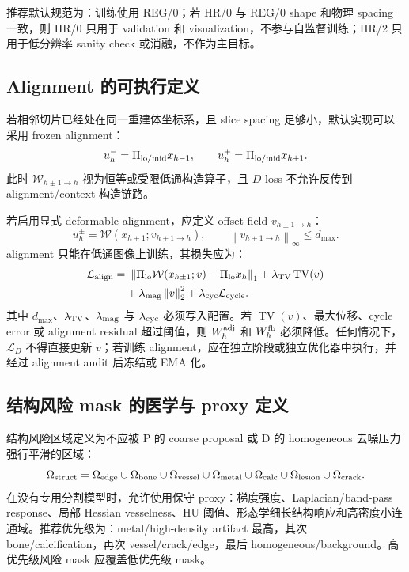 \documentclass[11pt,a4paper,UTF8,fontset=fandol]{ctexart}
\theoremstyle{definition}
\DeclareMathOperator{\TV}{TV}
\newcommand{\norm}[1]{\left\lVert#1\right\rVert}
\begin{document}
推荐默认规范为：训练使用 REG/0；若 HR/0 与 REG/0 shape 和物理 spacing 一致，则 HR/0 只用于 validation 和 visualization，不参与自监督训练；HR/2 只用于低分辨率 sanity check 或消融，不作为主目标。

\subsection{Alignment 的可执行定义}
\label{subsec:alignment-executable-protocol}

若相邻切片已经处在同一重建体坐标系，且 slice spacing 足够小，默认实现可以采用 frozen alignment：
\begin{equation}
    u_h^- = \Pi_{\rm lo/mid}x_{h-1},
    \qquad
    u_h^+ = \Pi_{\rm lo/mid}x_{h+1}.
\end{equation}
此时 $\mathcal W_{h\pm1\to h}$ 视为恒等或受限低通构造算子，且 $D$ loss 不允许反传到 alignment/context 构造链路。

若启用显式 deformable alignment，应定义 offset field $v_{h\pm1\to h}$：
\begin{equation}
    u_h^{\pm}=\mathcal W(x_{h\pm1};v_{h\pm1\to h}),
    \qquad
    \norm{v_{h\pm1\to h}}_\infty\le d_{\max} .
\end{equation}
alignment 只能在低通图像上训练，其损失应为：
\begin{equation}
\begin{aligned}
    \mathcal L_{\rm align}
    =&\ \norm{\Pi_{\rm lo}\mathcal W(x_{h\pm1};v)-\Pi_{\rm lo}x_h}_1
    +\lambda_{\rm TV}\TV(v) \\
    &+\lambda_{\rm mag}\norm{v}_2^2
    +\lambda_{\rm cyc}\mathcal L_{\rm cycle} .
\end{aligned}
\end{equation}
其中 $d_{\max}$、$\lambda_{\rm TV}$、$\lambda_{\rm mag}$ 与 $\lambda_{\rm cyc}$ 必须写入配置。若 $\TV(v)$、最大位移、cycle error 或 alignment residual 超过阈值，则 $W_h^{\rm adj}$ 和 $W_h^{\rm fb}$ 必须降低。任何情况下，$\mathcal L_D$ 不得直接更新 $v$；若训练 alignment，应在独立阶段或独立优化器中执行，并经过 alignment audit 后冻结或 EMA 化。

\subsection{结构风险 mask 的医学与 proxy 定义}
\label{subsec:medical-structure-risk-mask}

结构风险区域定义为不应被 P 的 coarse proposal 或 D 的 homogeneous 去噪压力强行平滑的区域：
\begin{equation}
    \Omega_{\rm struct}=
    \Omega_{\rm edge}\cup\Omega_{\rm bone}\cup\Omega_{\rm vessel}\cup
    \Omega_{\rm metal}\cup\Omega_{\rm calc}\cup\Omega_{\rm lesion}\cup\Omega_{\rm crack} .
\end{equation}
在没有专用分割模型时，允许使用保守 proxy：梯度强度、Laplacian/band-pass response、局部 Hessian vesselness、HU 阈值、形态学细长结构响应和高密度小连通域。推荐优先级为：metal/high-density artifact 最高，其次 bone/calcification，再次 vessel/crack/edge，最后 homogeneous/background。高优先级风险 mask 应覆盖低优先级 mask。
\end{document}
